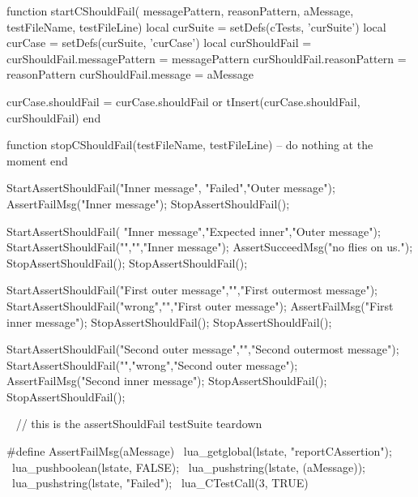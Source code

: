 \startLuaCode
function startCShouldFail(
  messagePattern, reasonPattern, aMessage,
  testFileName, testFileLine)
  local curSuite     = setDefs(cTests, 'curSuite')
  local curCase      = setDefs(curSuite, 'curCase')
  local curShouldFail   = { }
  curShouldFail.messagePattern = messagePattern
  curShouldFail.reasonPattern  = reasonPattern
  curShouldFail.message        = aMessage
  
  curCase.shouldFail = curCase.shouldFail or { }
  tInsert(curCase.shouldFail, curShouldFail)
end

function stopCShouldFail(testFileName, testFileLine)
  -- do nothing at the moment
end
\stopLuaCode


\startCTest
StartAssertShouldFail("Inner message", "Failed","Outer message");
  AssertFailMsg("Inner message");
StopAssertShouldFail();
\stopCTest
\stopTestCase


\startCTest
StartAssertShouldFail(
  "Inner message","Expected inner","Outer message");
  StartAssertShouldFail("","","Inner message");
    AssertSucceedMsg("no flies on us.");
  StopAssertShouldFail();
StopAssertShouldFail();
\stopCTest
\stopTestCase


\startCTest
StartAssertShouldFail("First outer message","","First outermost message");
StartAssertShouldFail("wrong","","First outer message");
  AssertFailMsg("First inner message");
StopAssertShouldFail();
StopAssertShouldFail();

StartAssertShouldFail("Second outer message","","Second outermost message");
StartAssertShouldFail("","wrong","Second outer message");
  AssertFailMsg("Second inner message");
StopAssertShouldFail();
StopAssertShouldFail();
\stopCTest
\stopTestCase

\CTestsSuiteTeardown\
\startCTest
  // this is the assertShouldFail testSuite teardown
\stopCTest

\stopTestSuite

\startTestSuite[assertFail]

\startCHeader
#define AssertFailMsg(aMessage)              \
  lua_getglobal(lstate, "reportCAssertion"); \
  lua_pushboolean(lstate, FALSE);            \
  lua_pushstring(lstate, (aMessage));        \
  lua_pushstring(lstate, "Failed");          \
  lua_CTestCall(3, TRUE)
  
